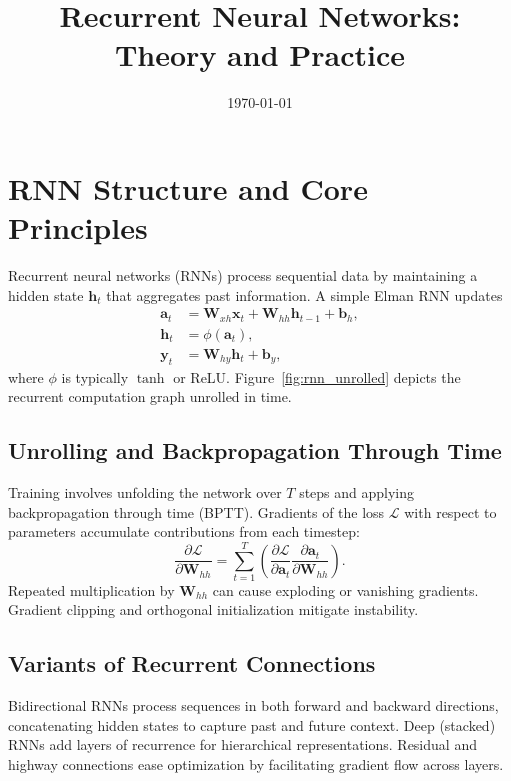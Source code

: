 ﻿\documentclass[12pt]{article}
\title{Recurrent Neural Networks: Theory and Practice}
\author{}
\date{\today}
\begin{document}
\maketitle

\section{RNN Structure and Core Principles}
Recurrent neural networks (RNNs) process sequential data by maintaining a hidden state $\mathbf{h}_t$ that aggregates past information. A simple Elman RNN updates
\begin{align}
  \mathbf{a}_t &= \mathbf{W}_{xh} \mathbf{x}_t + \mathbf{W}_{hh} \mathbf{h}_{t-1} + \mathbf{b}_h, \\
  \mathbf{h}_t &= \phi(\mathbf{a}_t), \\
  \mathbf{y}_t &= \mathbf{W}_{hy} \mathbf{h}_t + \mathbf{b}_y,
\end{align}
where $\phi$ is typically $\tanh$ or ReLU. Figure~\ref{fig:rnn_unrolled} depicts the recurrent computation graph unrolled in time.

\subsection{Unrolling and Backpropagation Through Time}
Training involves unfolding the network over $T$ steps and applying backpropagation through time (BPTT). Gradients of the loss $\mathcal{L}$ with respect to parameters accumulate contributions from each timestep:
\begin{equation}
  \frac{\partial \mathcal{L}}{\partial \mathbf{W}_{hh}} = \sum_{t=1}^{T} \left( \frac{\partial \mathcal{L}}{\partial \mathbf{a}_t} \frac{\partial \mathbf{a}_t}{\partial \mathbf{W}_{hh}} \right).
\end{equation}
Repeated multiplication by $\mathbf{W}_{hh}$ can cause exploding or vanishing gradients. Gradient clipping and orthogonal initialization mitigate instability.

\subsection{Variants of Recurrent Connections}
Bidirectional RNNs process sequences in both forward and backward directions, concatenating hidden states to capture past and future context. Deep (stacked) RNNs add layers of recurrence for hierarchical representations. Residual and highway connections ease optimization by facilitating gradient flow across layers.
\end{document}
